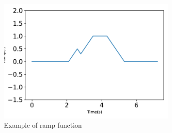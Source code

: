 \begin{figure}[htbp]\centerline{\includegraphics[width=0.8\textwidth]{AutoTeX/Ramp_function}}\caption{Example of ramp function}\label{fig:Ramp_function}\end{figure}